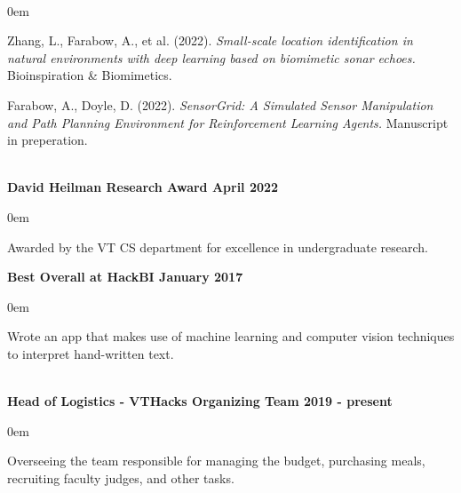 \documentclass{article}
\begin{document}
\begin{center}
\begin{flushleft}
    {\large\textbf{\underline{}}} \\
    \begin{compactitem}
      \itemsep0em
      \item Zhang, L., Farabow, A., et al. (2022). \emph{Small-scale location identification in natural environments with deep learning based on biomimetic sonar echoes.} Bioinspiration \& Biomimetics. \\
      \item Farabow, A., Doyle, D. (2022). \emph{SensorGrid: A Simulated Sensor Manipulation and Path Planning Environment for Reinforcement Learning Agents.} Manuscript in preperation. 
    \end{compactitem}

    {\large\textbf{\underline{}}} \\
    \textbf{David Heilman Research Award \hfill April 2022}
    \begin{compactitem}
      \itemsep0em
      \item Awarded by the VT CS department for excellence in undergraduate research.
    \end{compactitem}

    \textbf{Best Overall at HackBI \hfill January 2017}
    \begin{compactitem}
      \itemsep0em
      \item Wrote an app that makes use of machine learning and computer vision techniques to interpret hand-written text.
    \end{compactitem}


    {\large\textbf{\underline{}}} \\

    \textbf{Head of Logistics - VTHacks Organizing Team \hfill 2019 - present}
    \begin{compactitem}
      \itemsep0em
      \item Overseeing the team responsible for managing the budget, purchasing meals, recruiting faculty judges, and other tasks.
    \end{compactitem}


\end{flushleft}
\end{center}
\end{document}
